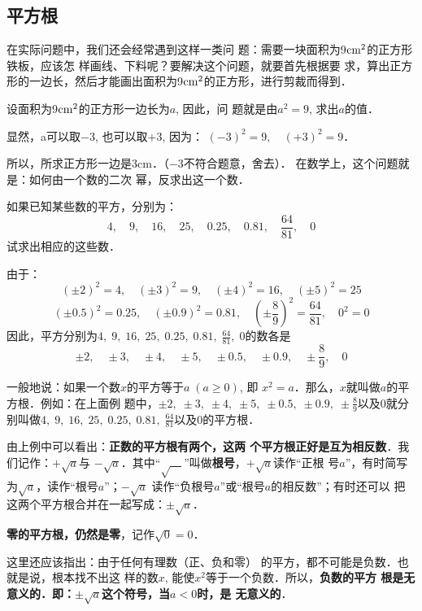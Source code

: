 \subsection{平方根}
在实际问题中，我们还会经常遇到这样一类问
题：需要一块面积为9${\rm cm}^2$的正方形铁板，应该怎
样画线、下料呢？要解决这个问题，就要首先根据要
求，算出正方形的一边长，然后才能画出面积为9${\rm cm}^2$的正方形，进行剪裁而得到．

设面积为9${\rm cm}^2$的正方形一边长为$a$, 因此，问
题就是由$a^2=9$, 求出$a$的值．

显然，a可以取$-3$, 也可以取$+3$, 因为：
$(-3)^2=9,\quad (+3)^2=9$．

所以，所求正方形一边是3cm．（$-3$不符合题意，舍去）．
在数学上，这个问题就是：如何由一个数的二次
幂，反求出这一个数．

\begin{example}
    如果已知某些数的平方，分别为：
$$4,\quad 9,\quad 16,\quad 25,\quad 0.25,\quad 0.81,\quad \frac{64}{81},\quad 0$$
试求出相应的这些数．
\end{example}

\begin{solution}
由于：   
\[(\pm 2)^2=4,\quad  (\pm 3)^2=9,\quad (\pm 4)^2=16,\quad (\pm 5)^2=25\]
\[(\pm 0.5)^2=0.25,\quad (\pm 0.9)^2=0.81,\quad \left(\pm \frac{8}{9}\right)^2=\frac{64}{81},\quad 0^2=0 \]
因此，平方分别为$4,\; 9,\; 16,\; 25,\; 0.25,\; 0.81,\; \frac{64}{81},\; 0$的数各是
$$\pm 2,\quad \pm 3,\quad\pm 4,\quad\pm 5,\quad\pm 0.5,\quad\pm 0.9,\quad
\pm \frac{8}{9},\quad 0$$
\end{solution}

一般地说：如果一个数$x$的平方等于$a\; (a\ge 0)$, 即
$x^2=a$．那么，$x$就叫做$a$的平方根．例如：在上面例
题中，$\pm 2,\; \pm 3,\;\pm 4,\;\pm 5,\;\pm 0.5,\;\pm 0.9,\;
\pm \frac{8}{9}$以及0就分别叫做$4,\; 9,\; 16,\; 25,\; 0.25,\; 0.81,\; \frac{64}{81}$以及0的平方根．

由上例中可以看出：\textbf{正数的平方根有两个，这两
个平方根正好是互为相反数}．我们记作：$+\sqrt{a}$与
$-\sqrt{a}$．其中“$\sqrt{\quad}$”叫做\textbf{根号}，$+\sqrt{a}$读作“正根
号$a$”，有时简写为$\sqrt{a}$，读作“根号$a$”；$-\sqrt{a}$
读作“负根号$a$”或“根号$a$的相反数”；有时还可以
把这两个平方根合并在一起写成：$\pm \sqrt{a}$．

\textbf{零的平方根，仍然是零}，记作$\sqrt{0}=0$．

这里还应该指出：由于任何有理数（正、负和零）
的平方，都不可能是负数．也就是说，根本找不出这
样的数$x$, 能使$x^2$等于一个负数．所以，\textbf{负数的平方
根是无意义的．即：$\pm \sqrt{a}$这个符号，当$a<0$时，是
无意义的}．

